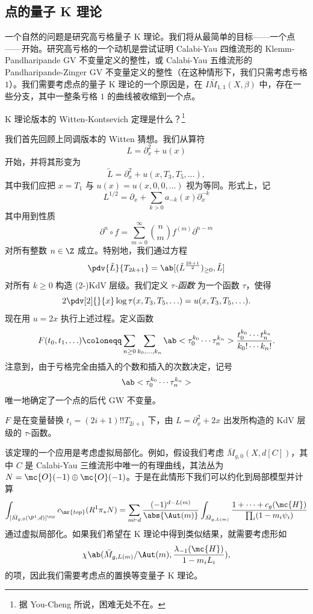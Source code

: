 \subsection{点的量子 K 理论}%
\label{sub:Quantum K-theory of a point}

一个自然的问题是研究高亏格量子 K 理论。我们将从最简单的目标——一个点——开始。研究高亏格的一个动机是尝试证明 Calabi-Yau 四维流形的 Klemm-Pandharipande GV 不变量定义的整性，或 Calabi-Yau 五维流形的 Pandharipande-Zinger GV 不变量定义的整性（在这种情形下，我们只需考虑亏格 \(1\)）。我们需要考虑点的量子 K 理论的一个原因是，在 \(I\bar{M}_{1,1}(X, \beta)\) 中，存在一些分支，其中一整条亏格 \(1\) 的曲线被收缩到一个点。

\begin{quest}
    K 理论版本的 Witten-Kontsevich 定理是什么？\footnote{据 You-Cheng 所说，困难无处不在。}
\end{quest}

我们首先回顾上同调版本的 Witten 猜想。我们从算符
\[ L = \partial_x^2 + u(x) \]
开始，并将其形变为
\[ \tilde{L} = \partial_x^2 + u(x, T_3, T_5, \ldots), \]
其中我们应把 \(x = T_1\) 与 \(u(x) = u(x, 0, 0,\ldots)\) 视为等同。形式上，记
\[ L^{1/2} = \partial_x + \sum_{k > 0} a_{-k}(x) \partial_x^{-k} \]
其中用到性质
\[ \partial^n \circ f = \sum_{m = 0}^{\infty} \binom{n}{m} f^{(m)} \partial^{n-m} \]
对所有整数 \(n \in \Z\) 成立。特别地，我们通过方程
\[ \pdv{\tilde{L}}{T_{2k+1}} = \ab[(\tilde{L}^{\frac{2k+1}{2}})_{\geq 0}, \tilde{L}] \]
对所有 \(k \geq 0\) 构造 (2-)KdV 层级。我们定义 \textit{\(\tau\)-函数} 为一个函数 \(\tau\)，使得
\[ 2 \pdv[2]{}{x}\log \tau(x, T_3, T_5, \ldots) = u(x, T_3, T_5, \ldots). \]
现在用 \(u = 2x\) 执行上述过程。定义函数
\[ F(t_0, t_1, \ldots) \coloneqq \sum_{n \geq 0} \sum_{k_0, \ldots, k_n} \ab<\tau_0^{k_0} \cdots \tau_n^{k_n}> \frac{t_0^{k_0} \cdots t_n^{k_n}}{k_0! \cdots k_n!}. \]
注意到，由于亏格完全由插入的个数和插入的次数决定，记号
\[ \ab<\tau_0^{k_0} \cdots \tau_n^{k_n}> \]
唯一地确定了一个点的后代 GW 不变量。

\begin{thm}
    \(F\) 是在变量替换 \(t_i = (2i+1)!! T_{2i+1}\) 下，由 \(L = \partial_x^2 + 2x\) 出发所构造的 KdV 层级的 \(\tau\)-函数。
\end{thm}

该定理的一个应用是考虑虚拟局部化。例如，假设我们考虑 \(\bar{M}_{g,0}(X, d[C])\)，其中 \(C\) 是 Calabi-Yau 三维流形中唯一的有理曲线，其法丛为 \(N = \mc{O}(-1)\oplus \mc{O}(-1)\)。于是在此情形下我们可以约化到局部模型并计算
\begin{align*}
    \int_{[\bar{M}_{g,0}(\P^1, d)]^{\vir}} c_{\mr{top}}(R^1 \pi_* N) = \sum_{m \vdash d} \frac{(-1)^{d-L(m)}}{\abs{\Aut(m)}} \int_{\bar{M}_{g, L(m)}} \frac{1 + \cdots + c_g(\mc{H})}{\prod_i (1-m_i \psi_i)}
\end{align*}
通过虚拟局部化。如果我们希望在 K 理论中得到类似结果，就需要考虑形如
\[ \chi\ab(\bar{M}_{g, L(m)}/\Aut(m), \frac{\lambda_{-1}(\mc{H})}{1-m_i L_i}), \]
的项，因此我们需要考虑点的置换等变量子 K 理论。

